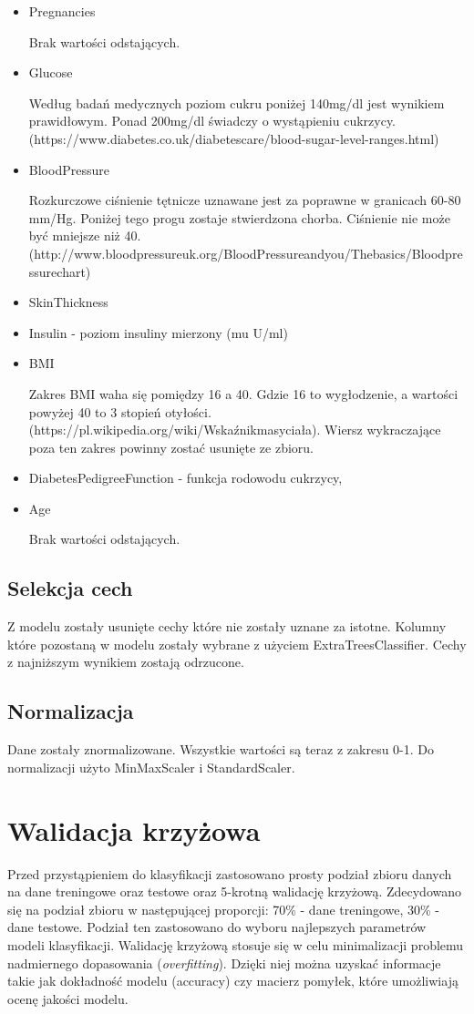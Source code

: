 \documentclass[12pt]{article}
\begin{document}
\begin{itemize}
\item Pregnancies

	Brak wartości odstających.
\item Glucose 

	Według badań medycznych poziom cukru poniżej 140mg/dl jest wynikiem prawidłowym. Ponad 200mg/dl świadczy o wystąpieniu cukrzycy. (https://www.diabetes.co.uk/diabetescare/blood-sugar-level-ranges.html)
\item BloodPressure 

	Rozkurczowe ciśnienie tętnicze uznawane jest za poprawne w granicach 60-80 mm/Hg. Poniżej tego progu zostaje stwierdzona chorba. Ciśnienie nie może być mniejsze niż 40. (http://www.bloodpressureuk.org/BloodPressureandyou/Thebasics/Bloodpressurechart)
\item SkinThickness


\item Insulin - poziom insuliny mierzony (mu U/ml)
\item BMI 

	Zakres BMI waha się pomiędzy 16 a 40. Gdzie 16 to wygłodzenie, a wartości powyżej 40 to 3 stopień otyłości. (https://pl.wikipedia.org/wiki/Wskaźnikmasyciała). Wiersz wykraczające poza ten zakres powinny zostać usunięte ze zbioru.
	
\item DiabetesPedigreeFunction - funkcja rodowodu cukrzycy,
\item Age
	
	Brak wartości odstających.

\end{itemize}
\subsection{Selekcja cech}
	Z modelu zostały usunięte cechy które nie zostały uznane za istotne. Kolumny które pozostaną w modelu zostały wybrane z użyciem ExtraTreesClassifier. Cechy z najniższym wynikiem zostają odrzucone.  
\subsection{Normalizacja}
	Dane zostały znormalizowane. Wszystkie wartości są teraz z zakresu 0-1. Do normalizacji użyto MinMaxScaler i StandardScaler.

\section{Walidacja krzyżowa}
	Przed przystąpieniem do klasyfikacji zastosowano prosty podział zbioru danych na dane treningowe oraz testowe oraz 5-krotną walidację krzyżową. Zdecydowano się na podział zbioru w następującej proporcji: 70\% - dane treningowe, 30\% - dane testowe. Podział ten zastosowano do wyboru najlepszych parametrów modeli klasyfikacji. 
	Walidację krzyżową stosuje się w celu minimalizacji problemu nadmiernego dopasowania (\textit{overfitting}). Dzięki niej można uzyskać informacje takie jak dokładność modelu (accuracy) czy macierz pomyłek, które umożliwiają ocenę jakości modelu.
	
\end{document}
